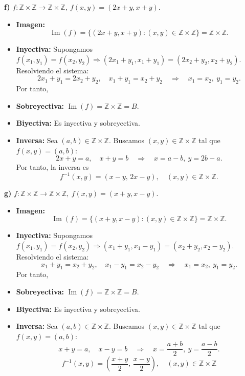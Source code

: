 \documentclass[a4paper,12pt]{article}
\begin{document}
\begin{ejercicio}[title=Ejercicio 19]

\textbf{f) } $f:\mathbb{Z}\times\mathbb{Z}\to\mathbb{Z}\times\mathbb{Z},\ f(x,y)=(2x+y, x+y)$.

\begin{itemize}
  \item \textbf{Imagen:} 
  \[
    \operatorname{Im}(f) = \{ (2x+y, x+y) : (x,y) \in \mathbb{Z}\times\mathbb{Z} \} = \boxed{\mathbb{Z}\times\mathbb{Z}}.
  \]
  \item \textbf{Inyectiva:} Supongamos $f(x_1,y_1) = f(x_2,y_2) \Rightarrow (2x_1+y_1, x_1+y_1) = (2x_2+y_2, x_2+y_2)$.  
  Resolviendo el sistema:
  \[
    2x_1 + y_1 = 2x_2 + y_2, \quad x_1 + y_1 = x_2 + y_2 \quad \Rightarrow \quad x_1 = x_2, \ y_1 = y_2.
  \]  
  Por tanto, 
  \item \textbf{Sobreyectiva:} $\operatorname{Im}(f) = \mathbb{Z}\times\mathbb{Z} = B$. 
  \item \textbf{Biyectiva:} Es inyectiva y sobreyectiva. 
  \item \textbf{Inversa:}  
  Sea $(a,b) \in \mathbb{Z}\times\mathbb{Z}$. Buscamos $(x,y) \in \mathbb{Z}\times\mathbb{Z}$ tal que $f(x,y) = (a,b)$:  
  \[
    2x+y = a, \quad x+y = b \quad \Rightarrow \quad x = a-b, \ y = 2b-a.
  \]  
  Por tanto, la inversa es  
  \[
    \boxed{f^{-1}(x,y) = (x-y,\, 2x-y), \quad (x,y) \in \mathbb{Z}\times\mathbb{Z}}.
  \]
\end{itemize}

\textbf{g) } $f:\mathbb{Z}\times\mathbb{Z}\to\mathbb{Z}\times\mathbb{Z},\ f(x,y)=(x+y, x-y)$.

\begin{itemize}
  \item \textbf{Imagen:} 
  \[
    \operatorname{Im}(f) = \{ (x+y, x-y) : (x,y) \in \mathbb{Z}\times\mathbb{Z} \} = \boxed{\mathbb{Z}\times\mathbb{Z}}.
  \]
  \item \textbf{Inyectiva:} Supongamos $f(x_1,y_1) = f(x_2,y_2) \Rightarrow (x_1+y_1, x_1-y_1) = (x_2+y_2, x_2-y_2)$.  
  Resolviendo el sistema:
  \[
    x_1+y_1 = x_2+y_2, \quad x_1-y_1 = x_2-y_2 \quad \Rightarrow \quad x_1 = x_2, \ y_1 = y_2.
  \]  
  Por tanto, 
  \item \textbf{Sobreyectiva:} $\operatorname{Im}(f) = \mathbb{Z}\times\mathbb{Z} = B$. 
  \item \textbf{Biyectiva:} Es inyectiva y sobreyectiva. 
  \item \textbf{Inversa:}  
  Sea $(a,b) \in \mathbb{Z}\times\mathbb{Z}$. Buscamos $(x,y) \in \mathbb{Z}\times\mathbb{Z}$ tal que $f(x,y) = (a,b)$:  
  \[
    x+y = a, \quad x-y = b \quad \Rightarrow \quad x = \frac{a+b}{2}, \ y = \frac{a-b}{2}.
  \]
  \[
    \boxed{f^{-1}(x,y) = \left(\frac{x+y}{2},\, \frac{x-y}{2}\right), \quad (x,y) \in \mathbb{Z}\times\mathbb{Z}}
  \]
\end{itemize}
    
\end{ejercicio}
\end{document}
